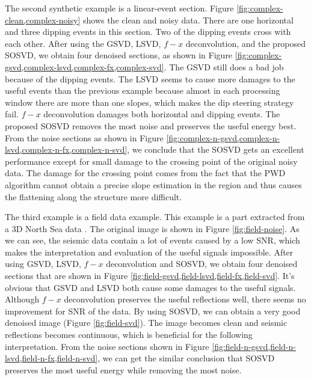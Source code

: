 The second synthetic example is a linear-event section. Figure \ref{fig:complex-clean,complex-noisy} shows the clean and noisy data. There are one horizontal and three dipping events in this section. Two of the dipping events cross with each other. After using the GSVD, LSVD, $f-x$ deconvolution, and the proposed SOSVD, we obtain four denoised sections, as shown in Figure \ref{fig:complex-gsvd,complex-lsvd,complex-fx,complex-svd}. The GSVD still does a bad job because of the dipping events. The LSVD seems to cause more damages to the useful events than the previous example because almost in each processing window there are more than one slopes, which makes the dip steering strategy fail. $f-x$ deconvolution damages both horizontal and dipping events. The proposed SOSVD removes the most noise and preserves the useful energy best. From the noise sections as shown in Figure \ref{fig:complex-n-gsvd,complex-n-lsvd,complex-n-fx,complex-n-svd}, we conclude that the SOSVD gets an excellent performance except for small damage to the crossing point of the original noisy data. The damage for the crossing point comes from the fact that the PWD algorithm cannot obtain a precise slope estimation in the region and thus causes the flattening along the structure more difficult. 
 
The third example is a field data example. This example is a part extracted from a 3D North Sea data \cite[]{lomask2006,fomel2010painting}.  The original image is shown in Figure \ref{fig:field-noise}. As we can see, the seismic data contain a lot of  events caused by a low SNR, which makes the interpretation and evaluation of the useful signals impossible. After using GSVD, LSVD, $f-x$ deconvolution and SOSVD, we obtain four denoised sections that are shown in Figure \ref{fig:field-gsvd,field-lsvd,field-fx,field-svd}. It's obvious that GSVD and LSVD both cause some damages to the useful signals. Although $f-x$ deconvolution preserves the useful reflections well, there seems no improvement for SNR of the data. By using SOSVD, we can obtain a very good denoised image (Figure \ref{fig:field-svd}). The image becomes clean and seismic reflections becomes continuous, which is beneficial for the following interpretation. From the noise sections shown in Figure \ref{fig:field-n-gsvd,field-n-lsvd,field-n-fx,field-n-svd}, we can get the similar conclusion that  SOSVD preserves the most useful energy while removing the most noise.

